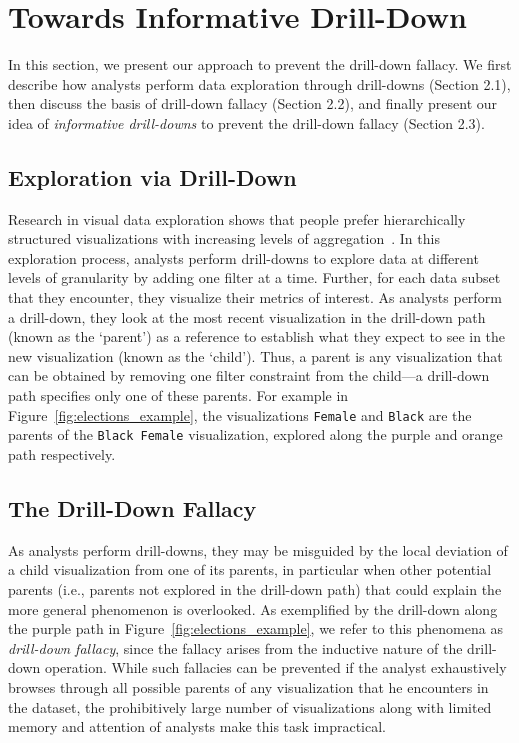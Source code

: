 
\section{Towards Informative Drill-Down\label{sec:datamodel}}
\par In this section, we present our approach to prevent the drill-down fallacy. We first describe how analysts perform data exploration through drill-downs (Section 2.1), then discuss the basis of drill-down fallacy (Section 2.2), and finally present our idea of \emph{informative drill-downs} to prevent the drill-down fallacy (Section 2.3).

\subsection{Exploration via Drill-Down}
Research in visual data exploration shows that people prefer hierarchically structured visualizations with increasing levels of aggregation~\cite{Kim2017,Hullman2017,Hullman2013}. In this exploration process, analysts perform drill-downs to explore data at different levels of granularity by adding one filter at a time. Further, for each data subset that they encounter, they visualize their metrics of interest. As analysts perform a drill-down, they look at the most recent visualization in the drill-down path (known as the `parent') as a reference to establish what they expect to see in the new visualization (known as the `child'). Thus, a parent is any visualization that can be obtained by removing one filter constraint from the child---a drill-down path specifies only one of these parents. For example in Figure~\ref{fig:elections_example}, the visualizations \texttt{Female} and \texttt{Black} are the parents of the \texttt{Black Female} visualization, explored along the purple and orange path respectively. 

\subsection{The Drill-Down Fallacy}
As analysts perform drill-downs, they may be misguided by the local deviation of a child visualization from one of its parents, in particular when other potential parents (i.e., parents not explored in the drill-down path) that could explain the more general phenomenon is overlooked. As exemplified by the drill-down along the purple path in Figure~\ref{fig:elections_example}, we refer to this phenomena as \emph{drill-down fallacy}, since the fallacy arises from the inductive nature of the drill-down operation. While such fallacies can be prevented if the analyst exhaustively browses through all possible parents of any visualization that he encounters in the dataset, the prohibitively large number of visualizations along with limited memory and attention of analysts make this task impractical.

